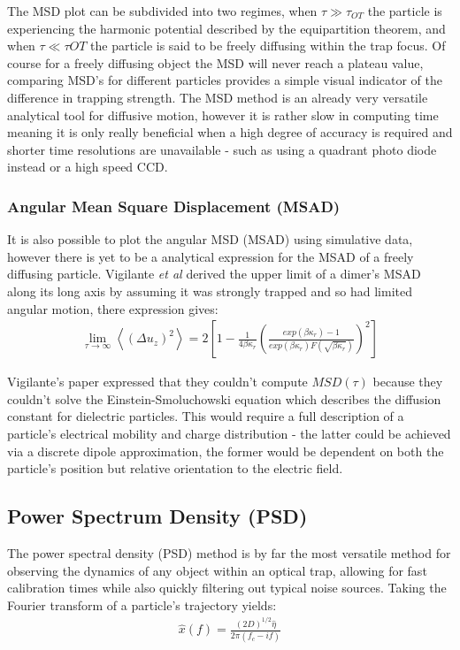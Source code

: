 The MSD plot can be subdivided into two regimes, when $\tau \gg \tau_{OT}$ 
the particle is experiencing the harmonic potential described by 
the equipartition theorem, and when $\tau \ll \tau{OT}$ the particle 
is said to be freely diffusing within the trap focus. Of course for 
a freely diffusing object the MSD will never reach a plateau value, 
comparing MSD's for different particles provides a simple visual 
indicator of the difference in trapping strength. The MSD method is 
an already very versatile analytical tool for diffusive motion, however 
it is rather slow in computing time meaning it is only really beneficial 
when a high degree of accuracy is required and shorter time resolutions 
are unavailable - such as using a quadrant photo diode instead or a high 
speed CCD.

\subsubsection{Angular Mean Square Displacement (MSAD)}
It is also possible to plot the angular MSD (MSAD) using simulative data, 
however there is yet to be a analytical expression for the MSAD of a 
freely diffusing particle. Vigilante \textit{et al} \cite{Vigilante2020} 
derived the upper limit of a dimer's MSAD along its long axis by assuming 
it was strongly trapped and so had limited angular motion, there expression 
gives:
\begin{align}
	\lim_{\tau\to\infty}\left<(\Delta u_z)^2\right> = 
	2\left[1-\frac{1}{4\beta\kappa_r} 
	\left(\frac{exp(\beta\kappa_r)-1}
	{exp(\beta\kappa_r)F(\sqrt{\beta\kappa_r})
	}\right)^2\right]
\end{align}  

Vigilante's paper expressed that they couldn't compute $MSD(\tau)$ because 
they couldn't solve the Einstein-Smoluchowski equation which describes the 
diffusion constant for dielectric particles. This would require a full 
description of a particle's electrical mobility and charge distribution 
- the latter could be achieved via a discrete dipole approximation, the 
former would be dependent on both the particle's position but relative 
orientation to the electric field.

\subsection{Power Spectrum Density (PSD)}
The power spectral density (PSD) method is by far the most versatile 
method for observing the dynamics of any object within an optical trap, 
allowing for fast calibration times while also quickly filtering out 
typical noise sources. Taking the Fourier transform of a particle's 
trajectory yields:
\begin{align}
	\hat{x}(f) = \frac{(2D)^{1/2}\hat{\eta}}{2\pi(f_c-if)}
\end{align}

